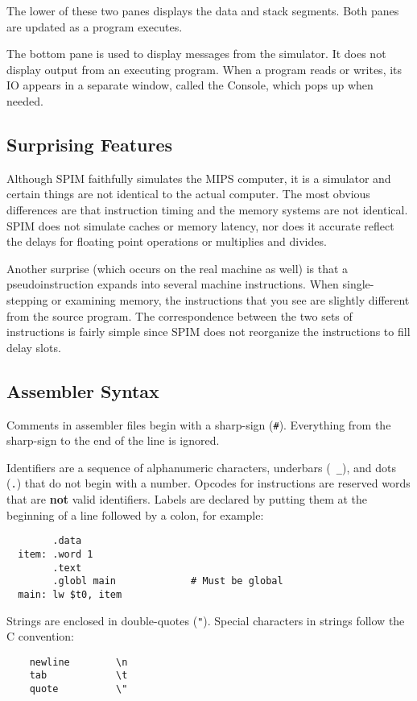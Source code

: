 The lower of these two panes displays the data and stack segments.
Both panes are updated as a program executes.

The bottom pane is used to display messages from the simulator.  It
does not display output from an executing program.  When a program
reads or writes, its IO appears in a separate window, called the
Console, which pops up when needed.

\subsection{Surprising Features}

Although SPIM faithfully simulates the MIPS computer, it is a
simulator and certain things are not identical to the actual computer.
The most obvious differences are that instruction timing and the
memory systems are not identical.  SPIM does not simulate caches or
memory latency, nor does it accurate reflect the delays for floating
point operations or multiplies and divides.

Another surprise (which occurs on the real machine as well) is that a
pseudoinstruction expands into several machine instructions.  When
single-stepping or examining memory, the instructions that you see are
slightly different from the source program.  The correspondence
between the two sets of instructions is fairly simple since SPIM does
not reorganize the instructions to fill delay slots.

\subsection{Assembler Syntax}
\label{sec:syntax}

Comments in assembler files begin with a sharp-sign ({\tt \#}).
Everything from the sharp-sign to the end of the line is ignored.

Identifiers are a sequence of alphanumeric characters, underbars ({\tt
\_}), and dots ({\tt .}) that do not begin with a number.  Opcodes for
instructions are reserved words that are {\bf not} valid identifiers.
Labels are declared by putting them at the beginning of a line
followed by a colon, for example:
\begin{verbatim}
        .data
  item: .word 1
        .text
        .globl main             # Must be global
  main: lw $t0, item
\end{verbatim}

Strings are enclosed in double-quotes ({\tt "}).  Special characters
in strings follow the C convention:
\begin{verbatim}
    newline        \n
    tab            \t
    quote          \"
\end{verbatim}

